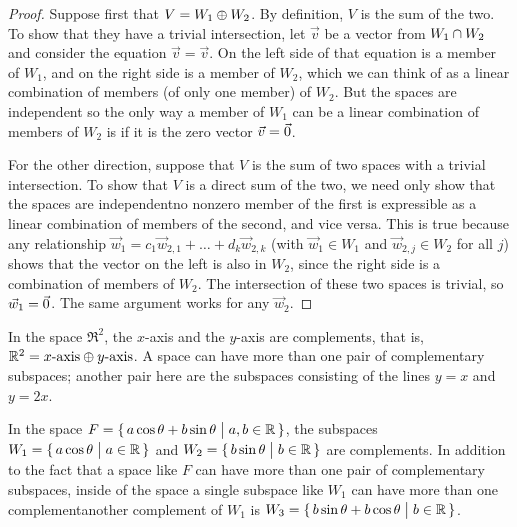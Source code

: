 \begin{proof}
Suppose first that $V=W_1\oplus W_2$.
By definition, $V$ is the sum of the two.
To show that they have a trivial intersection,
let $\vec{v}$ be a vector from $W_1\cap W_2$
and consider the equation $\vec{v}=\vec{v}$.
On the left side of that equation is a member of $W_1$,
and on the right side is a member of $W_2$, which we can think of as 
a linear combination of members (of only
one member) of $W_2$.
But the spaces are independent so the only way a member of $W_1$ can be a linear
combination of members of $W_2$ is if it is the zero vector $\vec{v}=\vec{0}$.

For the other direction, suppose that $V$ is the sum of two spaces
with a trivial intersection.
To show that $V$ is a direct sum of the two, we need only show that
the spaces are independent\Dash no nonzero member of the first is expressible 
as a linear combination of members of the second, and vice versa.
This is true because any relationship 
$\vec{w}_1=c_1\vec{w}_{2,1}+\dots+d_k\vec{w}_{2,k}$ (with $\vec{w}_1\in W_1$
and $\vec{w}_{2,j}\in W_2$ for all $j$) shows that the vector on the left is 
also in $W_2$, since the right side is a combination of members of $W_2$.
The intersection of these two spaces is trivial, so $\vec{w}_1=\vec{0}$.
The same argument works for any $\vec{w}_2$.
\end{proof}



\begin{example}
In the space $\Re^2$, the \( x \)-axis and the \( y \)-axis are complements,
that is, $\mathbb{R}^2=\text{$x$-axis}\oplus\text{$y$-axis}$.
A space can have more than one pair of complementary subspaces;
another pair here are the subspaces consisting of the 
lines \( y=x \) and \( y=2x \).
\end{example}

\begin{example}
In the space \( F=\mbox{$\{\,a\cos\theta+b\sin\theta\bigm| a,b\in\mathbb{R}\,\}$} \),
the subspaces \( W_1=\mbox{$\{\,a\cos\theta\bigm| a\in\mathbb{R}\,\}$} \) and
\( W_2=\mbox{$\{\,b\sin\theta\bigm| b\in\mathbb{R}\,\}$} \) are complements.
In addition to the fact that a space like $F$ can have more than one pair of
complementary subspaces, inside of the space a single subspace like $W_1$ can
have more than one complement\Dash another 
complement of \( W_1 \) is
\( W_3=\mbox{$\{\,b\sin\theta+b\cos\theta \bigm| b\in\mathbb{R}\,\}$} \).
\end{example}

